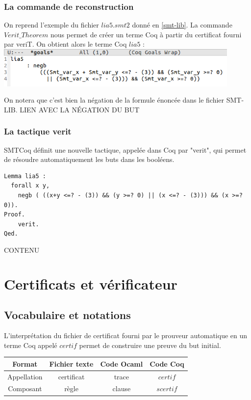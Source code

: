 \documentclass[11pt]{article}
\begin{document}
\subsubsection{La commande de reconstruction}

On reprend l'exemple du fichier $lia5.smt2$ donné en \ref{smt-lib}. 
La commande $Verit\_Theorem$ nous permet de créer un terme Coq à partir du certificat fourni par veriT. On obtient alors le terme Coq $lia5$ : \\

\includegraphics[height=2cm]{checklia5.png}

On notera que c'est bien la négation de la formule énoncée dans le fichier SMT-LIB. LIEN AVEC LA NÉGATION DU BUT

\subsubsection{La tactique verit}

SMTCoq définit une nouvelle tactique, appelée dans Coq par "verit", qui permet de résoudre automatiquement les buts dans les booléens. 

\begin{lstlisting}[frame=single]
Lemma lia5 : 
  forall x y,
    negb ( ((x+y <=? - (3)) && (y >=? 0) || (x <=? - (3))) && (x >=? 0)).
Proof.
    verit.
Qed.
\end{lstlisting}

CONTENU


\newpage
\section{Certificats et vérificateur}

\subsection{Vocabulaire et notations}

L'interprétation du fichier de certificat fourni par le prouveur automatique en un terme Coq appelé $certif$ permet de construire une preuve du but initial. \\

\begin{center}
\begin{tabular}{ |c||c|c|c| } 
 \hline
 Format & Fichier texte & Code Ocaml & Code Coq \\ 
 \hline
 Appellation & certificat & trace & $certif$ \\ 
 \hline
 Composant & règle & clause & $scertif$ \\ 
 \hline
\end{tabular}
\end{center}
\end{document}
